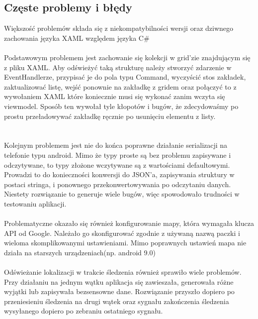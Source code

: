 \newpage
\subsection{Częste problemy i błędy} %
Większość problemów składa się z niekompatybilności wersji oraz dziwnego zachowania języka XAML względem języka C\#\\\\
Podstawowym problemem jest zachowanie się kolekcji w grid'zie znajdującym się z pliku XAML. Aby odświeżyć taką strukturę należy stworzyć zdarzenie w EventHandlerze, przypisać je do pola typu Command, wyczyścić stos zakładek, zaktualizować listę, wejść ponownie na zakładkę z gridem oraz połączyć to z wywołaniem XAML które koniecznie musi się wykonać zanim wczyta się viewmodel. Sposób ten wywołał tyle kłopotów i bugów, że zdecydowaśmy po prostu przeładowywać zakładkę ręcznie po usunięciu elementu z listy.\\\\\\

Kolejnym problemem jest nie do końca poprawne działanie serializacji na telefonie typu android. Mimo że typy proste są bez problemu zapisywane i odczytywane, to typy złożone wczytywane są z wartościami defaultowymi. Prowadzi to do konieczności konwersji do JSON'a, zapisywania struktury w postaci stringa, i ponownego przekonwertowywania po odczytaniu danych. Niestety rozwiązanie to generuje wiele bugów, więc spowodowało trudności w testowaniu aplikacji.\\\\

Problematyczne okazało się również konfigurowanie mapy, która wymagała klucza API od Google. Należało go skonfigurować zgodnie z używaną nazwą paczki i wieloma skomplikowanymi ustawieniami. Mimo poprawnych ustawień mapa nie działa na starszych urządzeniach(np. android 9.0)\\\\

Odświeżanie lokalizacji w trakcie śledzenia również sprawiło wiele problemów. Przy działaniu na jednym wątku aplikacja się zawieszała, generowała różne wyjątki lub zapisywała bezsensowne dane. Rozwiązanie przyszło dopiero po przeniesieniu śledzenia na drugi wątek oraz sygnału zakończenia śledzenia wysyłanego dopiero po zebraniu ostatniego sygnału.
